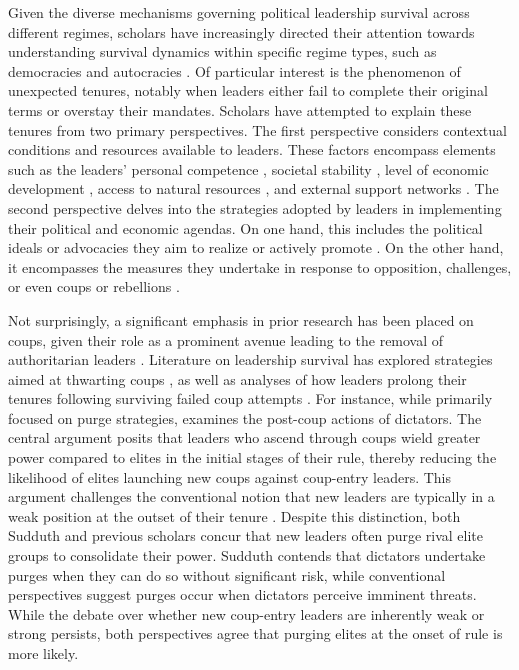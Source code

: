 \documentclass[
  12pt,
  a4paper,
  12pt]{article}
\begin{document}
Given the diverse mechanisms governing political leadership survival
across different regimes, scholars have increasingly directed their
attention towards understanding survival dynamics within specific regime
types, such as democracies \citep{svolik2014} and autocracies
\citep{davenport2021}. Of particular interest is the phenomenon of
unexpected tenures, notably when leaders either fail to complete their
original terms or overstay their mandates. Scholars have attempted to
explain these tenures from two primary perspectives. The first
perspective considers contextual conditions and resources available to
leaders. These factors encompass elements such as the leaders' personal
competence \citep{yu2016}, societal stability \citep{arriola2009}, level
of economic development \citep{palmer1999, williams2011}, access to
natural resources \citep{smith2004, quirozflores2012, wright2013}, and
external support networks \citep{licht2009, wright2008, thyne2017}. The
second perspective delves into the strategies adopted by leaders in
implementing their political and economic agendas. On one hand, this
includes the political ideals or advocacies they aim to realize or
actively promote \citep{gandhi2007, morrison2009}. On the other hand, it
encompasses the measures they undertake in response to opposition,
challenges, or even coups or rebellions
\citep{escribà-folch2013, davenport2021}.

Not surprisingly, a significant emphasis in prior research has been
placed on coups, given their role as a prominent avenue leading to the
removal of authoritarian leaders \citep{svolik2009, frantz2016}.
Literature on leadership survival has explored strategies aimed at
thwarting coups \citep{powell2017, sudduth2017, debruin2020}, as well as
analyses of how leaders prolong their tenures following surviving failed
coup attempts \citep{easton2018}. For instance, while primarily focused
on purge strategies, \citet{sudduth2017a} examines the post-coup actions
of dictators. The central argument posits that leaders who ascend
through coups wield greater power compared to elites in the initial
stages of their rule, thereby reducing the likelihood of elites
launching new coups against coup-entry leaders. This argument challenges
the conventional notion that new leaders are typically in a weak
position at the outset of their tenure \citep{roessler2011}. Despite
this distinction, both Sudduth and previous scholars concur that new
leaders often purge rival elite groups to consolidate their power.
Sudduth contends that dictators undertake purges when they can do so
without significant risk, while conventional perspectives suggest purges
occur when dictators perceive imminent threats. While the debate over
whether new coup-entry leaders are inherently weak or strong persists,
both perspectives agree that purging elites at the onset of rule is more
likely.
\end{document}
